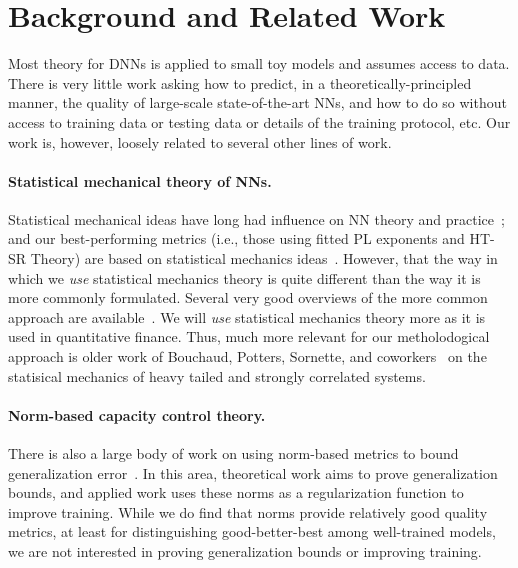 \section{Background and Related Work}
\label{sxn:background}

Most theory for DNNs is applied to small toy models and assumes access to data.
There is very little work asking how to predict, in a theoretically-principled manner, the quality of large-scale state-of-the-art NNs, and how to do so without access to training data or testing data or details of the training protocol, etc.
Our work is, however, loosely related to several other lines of work.

\paragraph{Statistical mechanical theory of NNs.}

Statistical mechanical ideas have long had influence on NN theory and practice~\cite{EB01_BOOK, MM17_TR, BKPx20}; and 
our best-performing metrics (i.e., those using fitted PL exponents and HT-SR Theory) are based on statistical mechanics ideas~\cite{MM17_TR, MM18_TR, MM19_HTSR_ICML, MM19_KDD, MM20_SDM}.
However, that the way in which we \emph{use} statistical mechanics theory is quite different than the way it is more commonly formulated.
Several very good overviews of the more common approach are available~\cite{EB01_BOOK, BKPx20}.
We will \emph{use} statistical mechanics theory more as it is used in quantitative finance.
Thus, much more relevant for our metholodogical approach is older work of Bouchaud, Potters, Sornette, and coworkers~\cite{BouchaudPotters03, SornetteBook, BP11, bun2017} on the statisical mechanics of heavy tailed and strongly correlated systems.


\paragraph{Norm-based capacity control theory.}

There is also a large body of work on using norm-based metrics to bound generalization error~\cite{NTS15, BFT17_TR, LMBx18_TR}.
In this area, theoretical work aims to prove generalization bounds, and applied work uses these norms as a regularization function to improve training.
While we do find that norms provide relatively good quality metrics, at least for distinguishing good-better-best among well-trained models, we are not interested in proving generalization bounds or improving training.


